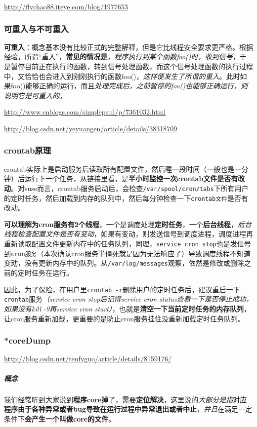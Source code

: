 \documentclass[UTF8,a4paper,8pt]{ctexart}
\begin{document}
			\url{http://flychao88.iteye.com/blog/1977653}
		
		\subsubsection{可重入与不可重入}
			\textbf{可重入}：概念基本没有比较正式的完整解释，但是它比线程安全要求更严格。根据经验，所谓“重入”，\textbf{常见的情况是}，\textit{程序执行到某个函数foo()时，收到信号}，于是暂停目前正在执行的函数，转到信号处理函数，而这个信号处理函数的执行过程中，又恰恰也会进入到刚刚执行的函数foo()，\textit{这样便发生了所谓的重入}。此时如果foo()能够正确的运行，而且\textit{处理完成后，之前暂停的foo()也能够正确运行，则说明它是可重入的}。
			
			\url{http://www.cnblogs.com/simplepaul/p/7361032.html}
			
			\url{http://blog.csdn.net/yeyuangen/article/details/38318709}
		\subsubsection{crontab原理}
			crontab实际上是启动服务后读取所有配置文件，然后睡一段时间（一般也是一分钟）后运行下一个任务，从链接里看，是\textbf{半小时监控一次crontab文件是否有改动}。对suse而言，crontab服务启动后，会检查\verb|/var/spool/cron/tabs|下所有用户的定时任务，然后加载到内存的队列中，然后每分钟检查一下\verb|crontab文件|是否有改动。
			
			\textbf{可以理解为cron服务有2个线程}，一个是调度处理\textbf{定时任务}，一个\textbf{后台线程}，\textit{后台线程检查配置文件是否有变动}，如果有变动，则发送信号到调度进程，调度进程再重新读取配置文件更新内存中的任务队列，同理，\verb|service cron stop|也是发信号到\verb|cron服务|（本次确认cron服务半僵死就是因为无法响应了）导致调度线程不知道变动，没有更新内存中的队列。从\verb|/var/log/messages|观察，依然是修改或删除之前的定时任务在运行。
			
			因此，为了保险，在用户里\verb|crontab -r|删除用户的定时任务后，建议重启一下\verb|crontab|服务\textit{（service cron stop后记得service cron status查看一下是否停止成功，如果没有kill -9再service cron start）}，也就是\textbf{清空一下当前定时任务的内存队列}，让cron服务重新加载，更重要的是防止cron服务挂住没重新加载定时任务队列。
		
		\subsubsection{*coreDump}
			\url{http://blog.csdn.net/tenfyguo/article/details/8159176/}
			\subparagraph{概念}
				我们经常听到大家说到\textbf{程序core掉}了，需要\textbf{定位解决}，这里说的\textit{大部分是指}对应\textbf{程序由于各种异常或者bug导致在运行过程中异常退出或者中止}，\textit{并且}在满足一定条件下\textbf{会产生一个叫做core的文件}。
				
\end{document}
